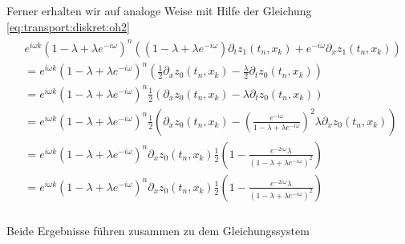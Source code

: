 Ferner erhalten wir auf analoge Weise mit Hilfe der Gleichung \eqref{eq:transport:diskret:oh2}
\begin{align}
\begin{split}
&e^{i \omega k} (1 - \lambda + \lambda e^{-i \omega})^{n} \left( (1 - \lambda + \lambda e^{-i \omega}) \partial_t z_1(t_n, x_k) + e^{- i \omega} \partial_x z_1(t_n, x_k) \right)\\
&= e^{i \omega k} (1 - \lambda + \lambda e^{-i \omega})^{n} \left( \frac{1}{2} \partial_x z_0(t_n, x_k) - \frac{\lambda}{2} \partial_t z_0(t_n, x_k) \right)\\
&= e^{i \omega k} (1 - \lambda + \lambda e^{-i \omega})^{n} \frac{1}{2} \left( \partial_x z_0(t_n, x_k) - \lambda \partial_t z_0(t_n, x_k) \right)\\
&= e^{i \omega k} (1 - \lambda + \lambda e^{-i \omega})^{n} \frac{1}{2} \left( \partial_x z_0(t_n, x_k) - \left( \frac{e^{- i \omega}}{1 - \lambda + \lambda e^{-i \omega}} \right)^2 \lambda \partial_x z_0(t_n, x_k) \right)\\
&= e^{i \omega k} (1 - \lambda + \lambda e^{-i \omega})^{n} \partial_x z_0(t_n, x_k) \frac{1}{2} \left( 1 - \frac{e^{- 2 i \omega} \lambda}{(1 - \lambda + \lambda e^{-i \omega})^2}  \right)\\
&= e^{i \omega k} (1 - \lambda + \lambda e^{-i \omega})^{n} \partial_x z_0(t_n, x_k) \frac{1}{2} \left( 1 - \frac{e^{- 2 i \omega} \lambda}{(1 - \lambda + \lambda e^{-i \omega})^2}  \right)\\
\end{split}
\end{align}

Beide Ergebnisse führen zusammen zu dem Gleichungssystem
\begin{align}

\end{align}

